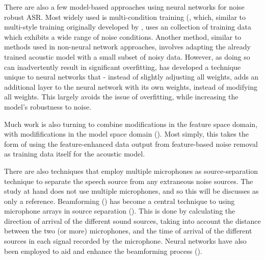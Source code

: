 \documentclass[dissertation,copyright]{uathesis}
\begin{document}
There are also a few model-based approaches using neural networks for noise robust ASR.  Most widely used is multi-condition training (\cite{seltzer:13,zhang:17}, which, similar to multi-style training originally developed by \cite{lippmann:87}, uses an collection of training data which exhibits a wide range of noise conditions.  Another method, similar to methods used in non-neural network approaches, involves adapting the already trained acoustic model with a small subset of noisy data.  However, as doing so can inadvertently result in significant overfitting, \cite{mirsamadi:15} has developed a technique unique to neural networks that - instead of slightly adjusting all weights, adds an additional layer to the neural network with its own weights, instead of modifying all weights.  This largely avoids the issue of overfitting, while increasing the model's robustness to noise.

Much work is also turning to combine modifications in the feature space domain, with modififications in the model space domain (\cite{weninger:13}).  Most simply, this takes the form of using the feature-enhanced data output from feature-based noise removal as training data itself for the acoustic model.


There are also techniques that employ multiple microphones as source-separation technique to separate the speech source from any extraneous noise sources.  The study at hand does not use multiple microphones, and so this will be discusses as only a reference.  Beamforming (\cite{veen:88}) has become a central technique to using microphone arrays in source separation (\cite{hori:15,zhang:17}).
This is done by calculating the direction of arrival of the different sound sources, taking into account the distance between the two (or more) microphones, and the time of arrival of the different sources in each signal recorded by the microphone.  Neural networks have also been employed to aid and enhance the beamforming process (\cite{heyman:15,sivasankaran:15,heyman:16}).  




% 
% 
% 
% 
% 
\end{document}
